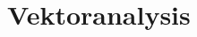\documentclass[a4paper,10pt]{scrbook}
\begin{document}
%



\section{Vektoranalysis}
\end{document}
